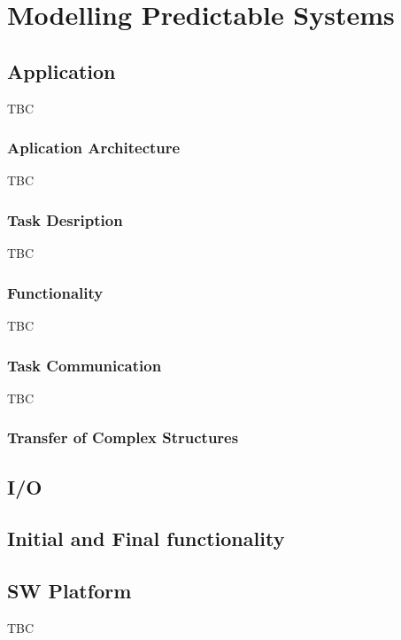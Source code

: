 \documentclass{article}
\begin{document}


\section{Modelling Predictable Systems}
\label{sec:mod_pred}

\subsection{Application}
\label{sec:application}
TBC

\subsubsection{Aplication Architecture}
\label{sec:app_arch}
TBC

\subsubsection{Task Desription}
\label{sec:app_arch}
TBC

\subsubsection{Functionality}
\label{sec:func}
TBC

\subsubsection{Task Communication}
\label{sec:app_comm}
TBC

\subsubsection{Transfer of Complex Structures}
\label{sec:app_complex_structures}



\subsection{I/O}
\label{sec:io}

\subsection{Initial and Final functionality}
\label{sec:app_initialization}



\subsection{SW Platform}
\label{sec:sw_platform}
TBC
\end{document}
